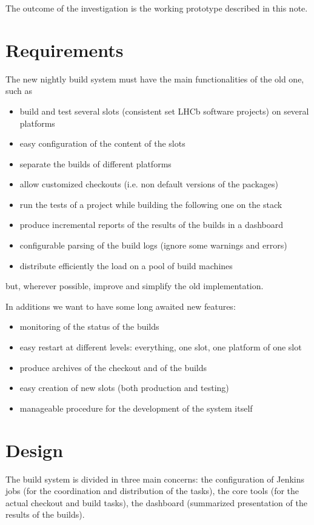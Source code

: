 \documentclass{lhcbnote}
\begin{document}
The outcome of the investigation is the working prototype described in this
note.

\section{Requirements}
The new nightly build system must have the main functionalities of the old one,
such as
\begin{itemize}
  \item build and test several slots (consistent set LHCb software projects) on
several platforms
  \item easy configuration of the content of the slots
  \item separate the builds of different platforms
  \item allow customized checkouts (i.e. non default versions of the packages)
  \item run the tests of a project while building the following one on the stack
  \item produce incremental reports of the results of the builds in a dashboard
  \item configurable parsing of the build logs (ignore some warnings and errors)
  \item distribute efficiently the load on a pool of build machines
\end{itemize}
but, wherever possible, improve and simplify the old implementation.

In additions we want to have some long awaited new features:
\begin{itemize}
  \item monitoring of the status of the builds
  \item easy restart at different levels: everything, one slot, one platform of
one slot
  \item produce archives of the checkout and of the builds
  \item easy creation of new slots (both production and testing)
  \item manageable procedure for the development of the system itself
\end{itemize}

\section{Design}
The build system is divided in three main concerns: the configuration of Jenkins
jobs (for the coordination and distribution of the tasks), the core tools (for
the actual checkout and build tasks), the dashboard (summarized presentation of
the results of the builds).
\end{document}

